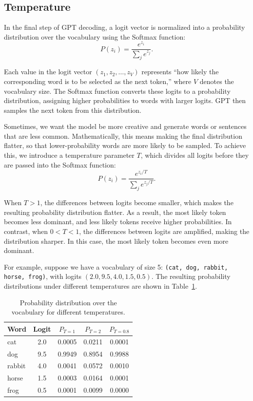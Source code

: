 \subsection{Temperature}

In the final step of GPT decoding, a logit vector is normalized into a probability distribution over the vocabulary using the Softmax function:
\begin{equation}
	P(z_i) = \frac{e^{z_i}}{\sum_j{e^{z_j}}}.
\end{equation}

Each value in the logit vector \((z_1, z_2, \dots, z_V)\) represents ``how likely the corresponding word is to be selected as the next token,'' where \(V\) denotes the vocabulary size. The Softmax function converts these logits to a probability distribution, assigning higher probabilities to words with larger logits. GPT then samples the next token from this distribution.

Sometimes, we want the model be more creative and generate words or sentences that are less common. Mathematically, this means making the final distribution flatter, so that lower-probability words are more likely to be sampled. To achieve this, we introduce a temperature parameter \(T\), which divides all logits before they are passed into the Softmax function:
\begin{equation}
	P(z_i) = \frac{e^{z_i/T}}{\sum_j{e^{z_j/T}}}.
\end{equation}

When \(T > 1\), the differences between logits become smaller, which makes the resulting probability distribution flatter. As a result, the most likely token becomes less dominant, and less likely tokens receive higher probabilities. In contrast, when \(0 < T < 1\), the differences between logits are amplified, making the distribution sharper. In this case, the most likely token becomes even more dominant.

For example, suppose we have a vocabulary of size 5: \texttt{(cat, dog, rabbit, horse, frog)}, with logits \((2.0, 9.5, 4.0, 1.5, 0.5)\). The resulting probability distributions under different temperatures are shown in Table~\ref{tab:probability_distribution_over_the_vocabulary}.

\begin{table}[h]
	\centering
	\begin{tabular}{lcccc}
		\toprule
		Word   & Logit & \(P_{T = 1}\) & \(P_{T = 2}\) & \(P_{T = 0.8}\) \\
		\midrule
		cat    & 2.0   & 0.0005        & 0.0211        & 0.0001          \\
		dog    & 9.5   & 0.9949        & 0.8954        & 0.9988          \\
		rabbit & 4.0   & 0.0041        & 0.0572        & 0.0010          \\
		horse  & 1.5   & 0.0003        & 0.0164        & 0.0001          \\
		frog   & 0.5   & 0.0001        & 0.0099        & 0.0000          \\
		\bottomrule
	\end{tabular}
	\caption{Probability distribution over the vocabulary for different temperatures.}
	\label{tab:probability_distribution_over_the_vocabulary}
\end{table}
